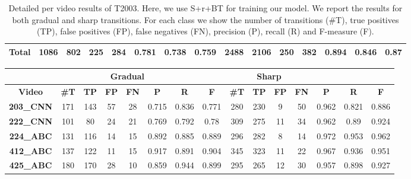 \documentclass[journal]{IEEEtran}
\begin{document}
\begin{table*}[h]
\begin{tabular}{|c|c|c|c|c|c|c|c|c|c|c|c|c|c|c|}
\textbf{Total}          & 1086          & 802         & 225         & 284         & 0.781      & 0.738      & 0.759      & 2488          & 2106        & 250         & 382         & 0.894      & 0.846      & 0.87       \\ \hline
\end{tabular}
\caption{Detailed per video results of T2003. Here, we use S+r+BT for training our model. We report the results for both gradual and sharp transitions. For each class we show the number of transitions (\#T), true positives (TP), false positives (FP), false negatives (FN), precision (P), recall (R) and F-measure (F).}
\label{2003_07}
\end{table*}

\begin{table*}[h]
\centering

\begin{tabular}{|c|c|c|c|c|c|c|c|c|c|c|c|c|c|c|}
\hline
 & \multicolumn{6}{c|}{\textbf{Gradual}} & \multicolumn{6}{c|}{\textbf{Sharp}}  \\ \hline
\textbf{Video}     & \textbf{\#T} & \textbf{TP} & \textbf{FP} & \textbf{FN} & \textbf{P} & \textbf{R} & \textbf{F} & \textbf{\#T} & \textbf{TP} & \textbf{FP} & \textbf{FN} & \textbf{P} & \textbf{R} & \textbf{F} \\ \hline
\textbf{203\_CNN} & 171          & 143         & 57          & 28          & 0.715      & 0.836      & 0.771      & 280          & 230         & 9           & 50          & 0.962      & 0.821      & 0.886      \\ \hline
\textbf{222\_CNN} & 101          & 80          & 24          & 21          & 0.769      & 0.792      & 0.78       & 309          & 275         & 11          & 34          & 0.962      & 0.89       & 0.924      \\ \hline
\textbf{224\_ABC} & 131          & 116         & 14          & 15          & 0.892      & 0.885      & 0.889      & 296          & 282         & 8           & 14          & 0.972      & 0.953      & 0.962      \\ \hline
\textbf{412\_ABC} & 137          & 122         & 11          & 15          & 0.917      & 0.891      & 0.904      & 345          & 323         & 11          & 22          & 0.967      & 0.936      & 0.951      \\ \hline
\textbf{425\_ABC} & 180          & 170         & 28          & 10          & 0.859      & 0.944      & 0.899      & 295          & 265         & 12          & 30          & 0.957      & 0.898      & 0.927      \\ \hline

\end{tabular}
\end{table*}
\end{document}
